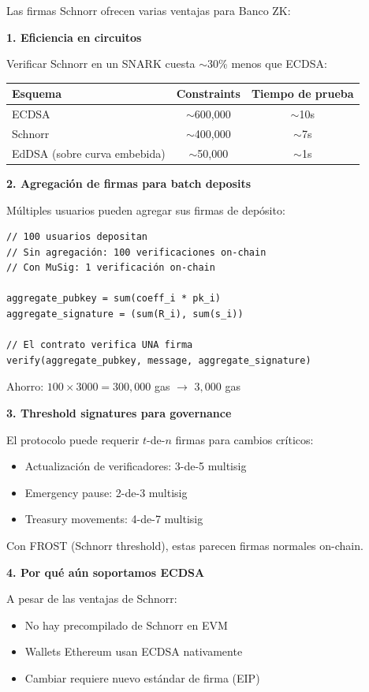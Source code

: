 \documentclass[11pt,a4paper,twoside,openright]{book}
\theoremstyle{definition}
\theoremstyle{plain}
\theoremstyle{remark}
\begin{document}
\begin{bancozk}
Las firmas Schnorr ofrecen varias ventajas para Banco ZK:

\textbf{1. Eficiencia en circuitos}

Verificar Schnorr en un SNARK cuesta $\sim$30\% menos que ECDSA:
\begin{center}
\begin{tabular}{lcc}
\toprule
\textbf{Esquema} & \textbf{Constraints} & \textbf{Tiempo de prueba} \\
\midrule
ECDSA & $\sim$600,000 & $\sim$10s \\
Schnorr & $\sim$400,000 & $\sim$7s \\
EdDSA (sobre curva embebida) & $\sim$50,000 & $\sim$1s \\
\bottomrule
\end{tabular}
\end{center}

\textbf{2. Agregación de firmas para batch deposits}

Múltiples usuarios pueden agregar sus firmas de depósito:
\begin{verbatim}
// 100 usuarios depositan
// Sin agregación: 100 verificaciones on-chain
// Con MuSig: 1 verificación on-chain

aggregate_pubkey = sum(coeff_i * pk_i)
aggregate_signature = (sum(R_i), sum(s_i))

// El contrato verifica UNA firma
verify(aggregate_pubkey, message, aggregate_signature)
\end{verbatim}

Ahorro: $100 \times 3000 = 300,000$ gas $\to$ $3,000$ gas

\textbf{3. Threshold signatures para governance}

El protocolo puede requerir $t$-de-$n$ firmas para cambios críticos:
\begin{itemize}
    \item Actualización de verificadores: 3-de-5 multisig
    \item Emergency pause: 2-de-3 multisig
    \item Treasury movements: 4-de-7 multisig
\end{itemize}

Con FROST (Schnorr threshold), estas parecen firmas normales on-chain.

\textbf{4. Por qué aún soportamos ECDSA}

A pesar de las ventajas de Schnorr:
\begin{itemize}
    \item No hay precompilado de Schnorr en EVM
    \item Wallets Ethereum usan ECDSA nativamente
    \item Cambiar requiere nuevo estándar de firma (EIP)
\end{itemize}


\end{bancozk}
\end{document}
